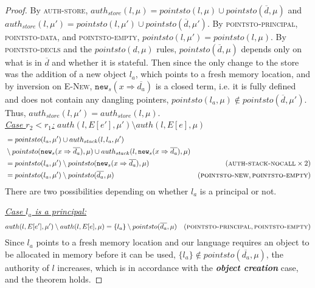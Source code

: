 \documentclass{llncs}
\newcommand{\keywadj}[1]{\mathtt{#1}}
\begin{document}
\begin{proof}
By \textsc{auth-store}, $auth_{store}(l, \mu) = pointsto(l, \mu) \cup pointsto(\overline{d}, \mu)$ and $auth_{store}(l, \mu') = pointsto(l, \mu') \cup pointsto(\overline{d}, \mu')$. By \textsc{pointsto-principal}, \textsc{pointsto-data}, and \textsc{pointsto-empty}, $pointsto(l, \mu') = pointsto(l, \mu)$. By \textsc{pointsto-decls} and the $pointsto(d, \mu)$ rules, $pointsto(\overline{d}, \mu)$ depends only on what is in $\overline{d}$ and whether it is stateful. Then since the only change to the store was the addition of a new object $l_a$, which points to a fresh memory location, and by inversion on \textsc{E-New}, $\keywadj{new}_s(x \Rightarrow \overline{d_a})$ is a closed term, i.e. it is fully defined and does not contain any dangling pointers, $pointsto(l_a, \mu) \not\in pointsto(\overline{d}, \mu')$. Thus, $auth_{store}(l, \mu') = auth_{store}(l, \mu)$.\\

\noindent\underline{\underline{\textit{Case $r_2 < r_1$:}}}
\noindent$auth(l, E[e'], \mu') \setminus auth(l, E[e], \mu)$
\vspace{-7pt}
\begin{align*}
&= pointsto(l_a, \mu') \cup auth_{stack}(l, l_a, \mu')\\
& \setminus pointsto(\keywadj{new}_s(x \Rightarrow \overline{d_a}), \mu) \cup auth_{stack}(l, \keywadj{new}_s(x \Rightarrow \overline{d_a}), \mu)\\
&= pointsto(l_a, \mu') \setminus pointsto(\keywadj{new}_s(x \Rightarrow \overline{d_a}), \mu) & (\textsc{auth-stack-nocall} \times 2)\\
&= pointsto(l_a, \mu') \setminus pointsto(\overline{d_a}, \mu) & (\textsc{pointsto-new}, \textsc{pointsto-empty})
\end{align*}
There are two possibilities depending on whether $l_a$ is a principal or not.

\noindent\underline{\textit{Case $l_a$ is a principal:}}
\vspace{-7pt}
\begin{align*}
auth(l, E[e'], \mu') \setminus auth(l, E[e], \mu) &= \{ l_a \} \setminus pointsto(\overline{d_a}, \mu) & (\textsc{pointsto-principal}, \textsc{pointsto-empty}) 
\end{align*}
Since $l_a$ points to a fresh memory location and our language requires an object to be allocated in memory before it can be used, $\{ l_a \} \not\in pointsto(\overline{d_a}, \mu)$, the authority of $l$ increases, which is in accordance with the \textbf{\textit{object creation}} case, and the theorem holds.


\end{proof}
\end{document}
